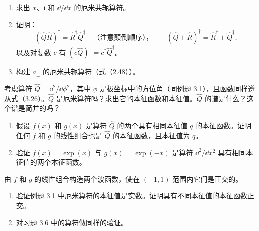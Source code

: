 \begin{enumerate}
\item 求出 $x$、$\mathrm{i}$ 和 $\dd/\dd x$ 的厄米共轭算符。
\item 证明：
\[
(\hat Q\hat R)^\dagger=\hat R^\dagger\hat Q^\dagger
\quad\text{（注意颠倒顺序），}\qquad
(\hat Q+\hat R)^\dagger=\hat R^\dagger+\hat Q^\dagger,
\]
以及对复数 $c$ 有 $(c\hat Q)^\dagger=c^*\hat Q^\dagger$。
\item 构建 $a_\pm$ 的厄米共轭算符（式（2.48））。
\end{enumerate}
\vfill

考虑算符 $\hat Q=\dd^2/\dd\phi^2$，其中 $\phi$ 是极坐标中的方位角（同例题 3.1），且函数同样遵从式（3.26）。$\hat Q$ 是厄米算符吗？求出它的本征函数和本征值。$\hat Q$ 的谱是什么？这个谱是简并的吗？
\vfill

\begin{enumerate}
\item 假设 $f(x)$ 和 $g(x)$ 是算符 $\hat Q$ 的两个具有相同本征值 $q$ 的本征函数。证明任何 $f$ 和 $g$ 的线性组合也是 $\hat Q$ 的本征函数，且本征值为 $q$。
\item 验证 $f(x)=\exp(x)$ 与 $g(x)=\exp(-x)$ 是算符 $\dd^2/\dd x^2$ 具有相同本征值的两个本征函数。
\end{enumerate}
由 $f$ 和 $g$ 的线性组合构造两个波函数，使在 $(-1,1)$ 范围内它们是正交的。
\vfill

\begin{enumerate}
\item 验证例题 3.1 中厄米算符的本征值是实数。证明具有不同本征值的本征函数正交。
\item 对习题 3.6 中的算符做同样的验证。
\end{enumerate}
\vfill
